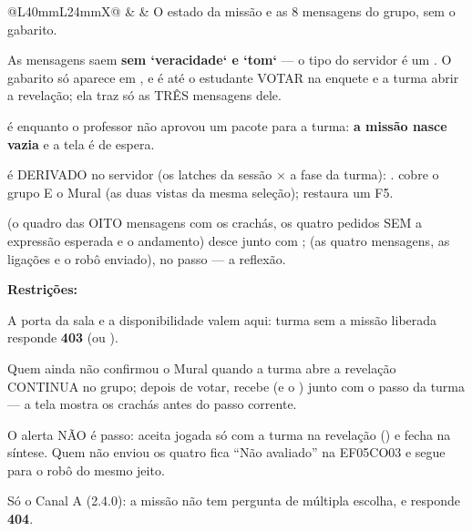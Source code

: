 \begin{tabularx}{\linewidth}{@{}L{40mm}L{24mm}X@{}}
\zebra {} &  & O estado da missão e as 8 mensagens do grupo, sem o gabarito.\par As mensagens saem \textbf{sem `veracidade` e `tom`} --- o tipo do servidor é um . O gabarito só aparece em , e  é  até o estudante VOTAR na enquete e a turma abrir a revelação; ela traz só as TRÊS mensagens dele.\par {} é  enquanto o professor não aprovou um pacote para a turma: \textbf{a missão nasce vazia} e a tela é de espera.\par {} é DERIVADO no servidor (os latches da sessão × a fase da turma): .  cobre o grupo E o Mural (as duas vistas da mesma seleção);  restaura um F5.\par {} (o quadro das OITO mensagens com os crachás, os quatro pedidos SEM a expressão esperada e o andamento) desce junto com ;  (as quatro mensagens, as ligações e o robô enviado), no passo  --- a reflexão.\par \textbf{Restrições:}\par \hspace*{1em}\textbullet{} A porta da sala  e a disponibilidade  valem aqui: turma sem a missão liberada responde \textbf{403}  (ou ).\par \hspace*{1em}\textbullet{} Quem ainda não confirmou o Mural quando a turma abre a revelação CONTINUA no grupo; depois de votar, recebe  (e o ) junto com o passo da turma --- a tela mostra os crachás antes do passo corrente.\par \hspace*{1em}\textbullet{} O alerta NÃO é passo: aceita jogada só com a turma na revelação () e fecha na síntese. Quem não enviou os quatro fica \enquote{Não avaliado} na EF05CO03 e segue para o robô do mesmo jeito.\par \hspace*{1em}\textbullet{} Só o Canal A (2.4.0): a missão não tem pergunta de múltipla escolha, e  responde \textbf{404}.\\

\end{tabularx}
